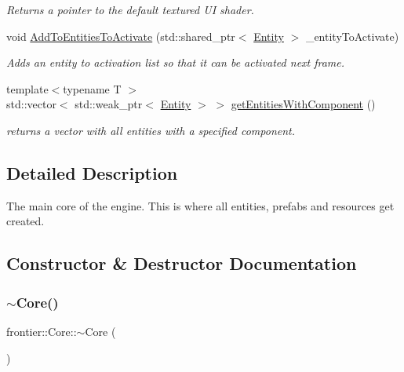 \begin{DoxyCompactItemize}
\begin{DoxyCompactList}\small\item\em Returns a pointer to the default textured UI shader. \end{DoxyCompactList}\item 
void \hyperlink{classfrontier_1_1_core_a0d510b25cca36dddb10b562913ae24c7}{Add\+To\+Entities\+To\+Activate} (std\+::shared\+\_\+ptr$<$ \hyperlink{classfrontier_1_1_entity}{Entity} $>$ \+\_\+entity\+To\+Activate)
\begin{DoxyCompactList}\small\item\em Adds an entity to activation list so that it can be activated next frame. \end{DoxyCompactList}\item 
{\footnotesize template$<$typename T $>$ }\\std\+::vector$<$ std\+::weak\+\_\+ptr$<$ \hyperlink{classfrontier_1_1_entity}{Entity} $>$ $>$ \hyperlink{classfrontier_1_1_core_a8c42c287ec4a96ff3be194f92e82c367}{get\+Entities\+With\+Component} ()
\begin{DoxyCompactList}\small\item\em returns a vector with all entities with a specified component. \end{DoxyCompactList}\end{DoxyCompactItemize}


\subsection{Detailed Description}
The main core of the engine. This is where all entities, prefabs and resources get created. 

\subsection{Constructor \& Destructor Documentation}
\mbox{\label{classfrontier_1_1_core_a4d5ae078d34758c54c517bede518e2e4}} 
\subsubsection{\texorpdfstring{$\sim$\+Core()}{~Core()}}
{\footnotesize\ttfamily frontier\+::\+Core\+::$\sim$\+Core (\begin{DoxyParamCaption}{ }\end{DoxyParamCaption})}




